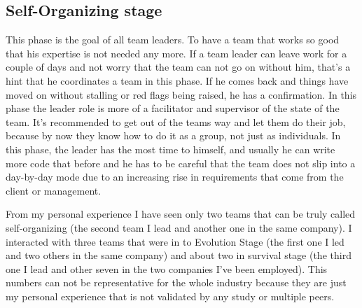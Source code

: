 \subsection{Self-Organizing stage}
This phase is the goal of all team leaders. To have a team that works so good that his expertise is not needed any more. If a team leader can leave work for a couple of days and not worry that the team can not go on without him, that's a hint that he coordinates a team in this phase. If he comes back and things have moved on without stalling or red flags being raised, he has a confirmation. In this phase the leader role is more of a facilitator and supervisor of the state of the team. It's recommended to get out of the teams way and let them do their job, because by now they know how to do it as a group, not just as individuals. In this phase, the leader has the most time to himself, and usually he can write more code that before and he has to be careful that the team does not slip into a day-by-day mode due to an increasing rise in requirements that come from the client or management.

From my personal experience I have seen only two teams that can be truly called self-organizing (the second team I lead and another one in the same company). I interacted with three teams that were in to Evolution Stage (the first one I led and two others in the same company) and about two in survival stage (the third one I lead and other seven in the two companies I've been employed). This numbers can not be representative for the whole industry because they are just my personal experience that is not validated by any study or multiple peers.
